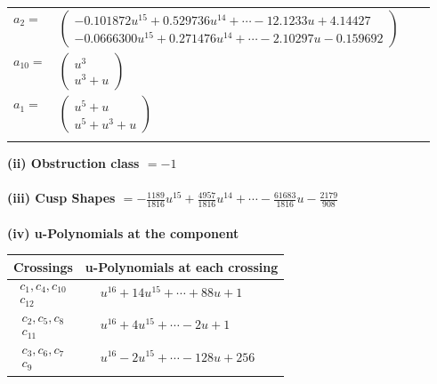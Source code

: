 \documentclass[1p]{elsarticle_modified}
\theoremstyle{definition}
\begin{document}
\begin{tabular}{m{7pt} m{180pt} m{7pt} m{180pt} }
\flushright $a_{2}=$&$\begin{pmatrix}-0.101872 u^{15}+0.529736 u^{14}+\cdots-12.1233 u+4.14427\\-0.0666300 u^{15}+0.271476 u^{14}+\cdots-2.10297 u-0.159692\end{pmatrix}$ \\
\flushright $a_{10}=$&$\begin{pmatrix}u^3\\u^3+u\end{pmatrix}$ \\
\flushright $a_{1}=$&$\begin{pmatrix}u^5+u\\u^5+u^3+u\end{pmatrix}$\\&\end{tabular}
\flushleft \textbf{(ii) Obstruction class $= -1$}\\~\\
\flushleft \textbf{(iii) Cusp Shapes $= -\frac{1189}{1816} u^{15}+\frac{4957}{1816} u^{14}+\cdots-\frac{61683}{1816} u-\frac{2179}{908}$}\\~\\
\newpage\renewcommand{\arraystretch}{1}
\flushleft \textbf{(iv) u-Polynomials at the component}\newline \\
\begin{tabular}{m{50pt}|m{274pt}}
Crossings & \hspace{64pt}u-Polynomials at each crossing \\
\hline $$\begin{aligned}c_{1},c_{4},c_{10}\\c_{12}\end{aligned}$$&$\begin{aligned}
&u^{16}+14 u^{15}+\cdots+88 u+1
\end{aligned}$\\
\hline $$\begin{aligned}c_{2},c_{5},c_{8}\\c_{11}\end{aligned}$$&$\begin{aligned}
&u^{16}+4 u^{15}+\cdots-2 u+1
\end{aligned}$\\
\hline $$\begin{aligned}c_{3},c_{6},c_{7}\\c_{9}\end{aligned}$$&$\begin{aligned}
&u^{16}-2 u^{15}+\cdots-128 u+256
\end{aligned}$\\
\hline
\end{tabular}\\~\\
\end{document}
